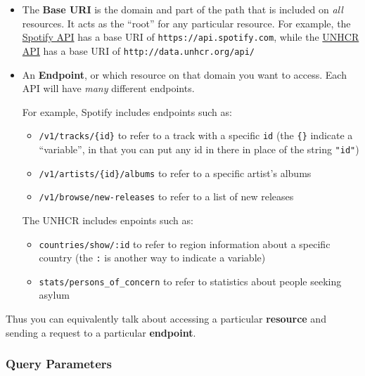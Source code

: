 \documentclass[]{book}
\providecommand{\tightlist}{%
  \setlength{\itemsep}{0pt}\setlength{\parskip}{0pt}}
\theoremstyle{definition}
\theoremstyle{definition}
\theoremstyle{remark}
\begin{document}
\begin{itemize}
\item
  The \textbf{Base URI} is the domain and part of the path that is
  included on \emph{all} resources. It acts as the ``root'' for any
  particular resource. For example, the
  \href{https://developer.spotify.com/web-api/endpoint-reference/}{Spotify
  API} has a base URI of \texttt{https://api.spotify.com}, while the
  \href{http://data.unhcr.org/wiki/index.php/API_Documentation.html}{UNHCR
  API} has a base URI of \texttt{http://data.unhcr.org/api/}
\item
  An \textbf{Endpoint}, or which resource on that domain you want to
  access. Each API will have \emph{many} different endpoints.

  For example, Spotify includes endpoints such as:

  \begin{itemize}
  \tightlist
  \item
    \texttt{/v1/tracks/\{id\}} to refer to a track with a specific
    \texttt{id} (the \texttt{\{\}} indicate a ``variable'', in that you
    can put any id in there in place of the string \texttt{"id"})
  \item
    \texttt{/v1/artists/\{id\}/albums} to refer to a specific artist's
    albums
  \item
    \texttt{/v1/browse/new-releases} to refer to a list of new releases
  \end{itemize}

  The UNHCR includes enpoints such as:

  \begin{itemize}
  \tightlist
  \item
    \texttt{countries/show/:id} to refer to region information about a
    specific country (the \texttt{:} is another way to indicate a
    variable)
  \item
    \texttt{stats/persons\_of\_concern} to refer to statistics about
    people seeking asylum
  \end{itemize}
\end{itemize}

Thus you can equivalently talk about accessing a particular
\textbf{resource} and sending a request to a particular
\textbf{endpoint}.

\subsubsection{Query Parameters}\label{query-parameters}
\end{document}
